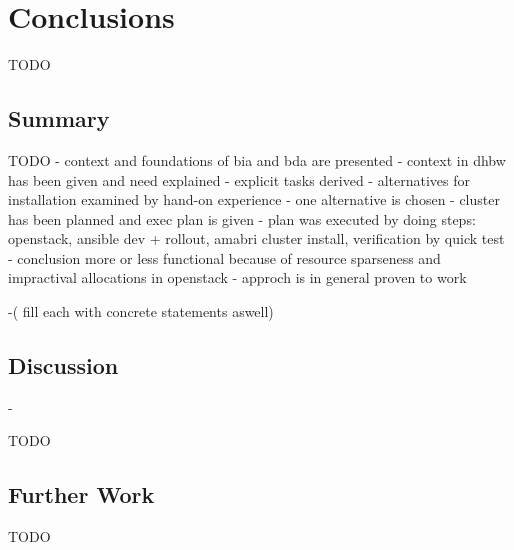 \chapter{Conclusions}
\label{chap:conc}

TODO

\section{Summary}

TODO
- context and foundations of bia and bda are presented
- context in dhbw has been given and need explained
- explicit tasks derived
- alternatives for installation examined by hand-on experience
- one alternative is chosen
- cluster has been planned and exec plan is given
- plan was executed by doing steps: openstack, ansible dev + rollout, amabri cluster install, verification by quick test
- conclusion more or less functional because of resource sparseness and impractival allocations in openstack
- approch is in general proven to work

-( fill each with concrete statements aswell)

\section{Discussion}

- 

TODO

\section{Further Work}

TODO
